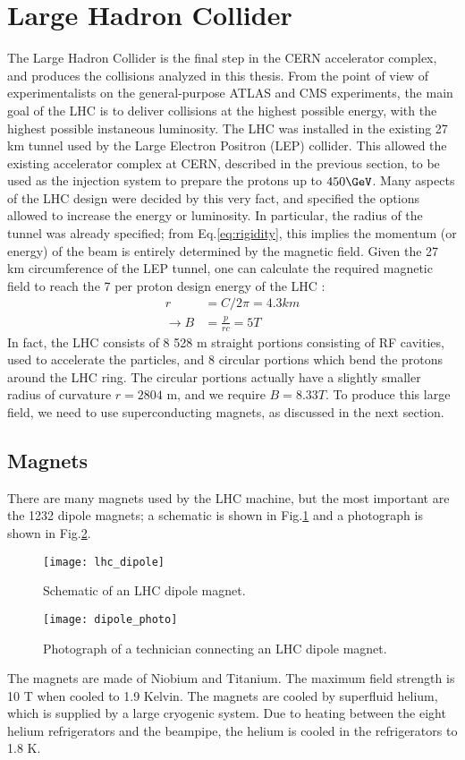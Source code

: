 \section{Large Hadron Collider}

The Large Hadron Collider is the final step in the CERN accelerator complex, and produces the collisions analyzed in this thesis.
From the point of view of experimentalists on the general-purpose ATLAS and CMS experiments, the main goal of the LHC is to deliver collisions at the highest possible energy, with the highest possible instaneous luminosity.
The LHC was installed in the existing 27 km tunnel used by the Large Electron Positron (LEP) collider.
This allowed the existing accelerator complex at CERN, described in the previous section, to be used as the injection system to prepare the protons up to $450 \GeV$.
Many aspects of the LHC design were decided by this very fact, and specified the options allowed to increase the energy or luminosity.
In particular, the radius of the tunnel was already specified; from Eq.\ref{eq:rigidity}, this implies the momentum (or energy) of the beam is entirely determined by the magnetic field.
Given the 27 km circumference of the LEP tunnel, one can calculate the required magnetic field to reach the 7 \TeV per proton design energy of the LHC :
\begin{align}
r &= C / 2\pi = 4.3 km \\
\rightarrow B &= \frac{p}{rc} = 5 T
\end{align}
In fact, the LHC consists of 8 528 m straight portions consisting of RF cavities, used to accelerate the particles, and 8 circular portions which bend the protons around the LHC ring.
The circular portions actually have a slightly smaller radius of curvature $r = 2804 $ m, and we require $B = 8.33 T$.
To produce this large field, we need to use superconducting magnets, as discussed in the next section.

\subsection{Magnets}

There are many magnets used by the LHC machine, but the most important are the 1232 dipole magnets; a schematic is shown in Fig.\ref{fig:dipole_schematic} and a photograph is shown in Fig.\ref{fig:dipole_photo}.
\begin{figure}
\caption{Schematic of an LHC dipole magnet.}\label{fig:dipole_schematic}
\texttt{[image: lhc\_dipole]}
\end{figure}
\begin{figure}
\caption{Photograph of a technician connecting an LHC dipole magnet.}\label{fig:dipole_photo}
\texttt{[image: dipole\_photo]}
\end{figure}
The magnets are made of Niobium and Titanium.
The maximum field strength is 10 T when cooled to 1.9 Kelvin.
The magnets are cooled by superfluid helium, which is supplied by a large cryogenic system.
Due to heating between the eight helium refrigerators and the beampipe, the helium is cooled in the refrigerators to 1.8 K.

